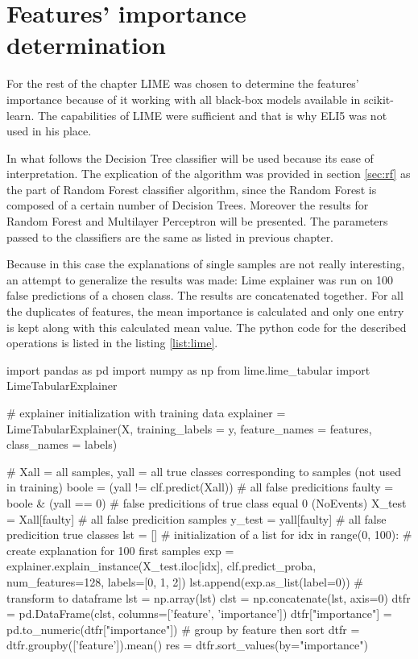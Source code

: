 \section{Features' importance determination}
For the rest of the chapter LIME was chosen to determine the features' importance because of it working with all black-box models available in scikit-learn. The capabilities of LIME were sufficient and that is why ELI5 was not used in his place.

In what follows the Decision Tree classifier will be used because its ease of interpretation. The explication of the algorithm was provided in section \ref{sec:rf} as the part of Random Forest classifier algorithm, since the Random Forest is composed of a certain number of Decision Trees. Moreover the results for Random Forest and Multilayer Perceptron will be presented. The parameters passed to the classifiers are the same as listed in previous chapter.

Because in this case the explanations of single samples are not really interesting, an attempt to generalize the results was made: Lime explainer was run on 100 false predictions of a chosen class. The results are concatenated together. For all the duplicates of features, the mean importance is calculated and only one entry is kept along with this calculated mean value. The python code for the described operations is listed in the listing \ref{list:lime}.

\begin{python}[caption = {Algorithm for determining the most important features using Lime that led to false predictions for 100 samples corresponding to NoEvents class}, label = list:lime]
import pandas as pd
import numpy as np
from lime.lime_tabular import LimeTabularExplainer

# explainer initialization with training data
explainer = LimeTabularExplainer(X, training_labels = y, feature_names = features, class_names = labels)

# Xall = all samples, yall = all true classes corresponding to samples (not used in training)
boole = (yall != clf.predict(Xall)) # all false predicitions
faulty = boole & (yall == 0) # false predicitions of true class equal 0 (NoEvents)
X_test = Xall[faulty] # all false predicition samples
y_test = yall[faulty] # all false predicition true classes
lst = [] # initialization of a list
for idx in range(0, 100): # create explanation for 100 first samples
    exp = explainer.explain_instance(X_test.iloc[idx], clf.predict_proba, num_features=128, labels=[0, 1, 2])
    lst.append(exp.as_list(label=0))
# transform to dataframe
lst = np.array(lst)
clst = np.concatenate(lst, axis=0)
dtfr = pd.DataFrame(clst, columns=['feature', 'importance'])
dtfr["importance"] = pd.to_numeric(dtfr["importance"])
# group by feature then sort
dtfr = dtfr.groupby(['feature']).mean()
res = dtfr.sort_values(by="importance")
\end{python}

